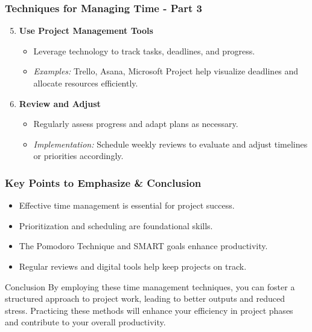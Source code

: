 \documentclass[aspectratio=169]{beamer}
\begin{document}
\begin{frame}[fragile]
    \frametitle{Techniques for Managing Time - Part 3}
    \begin{enumerate}
        \setcounter{enumi}{4} %
        \item \textbf{Use Project Management Tools}
            \begin{itemize}
                \item Leverage technology to track tasks, deadlines, and progress.
                \item \textit{Examples:} Trello, Asana, Microsoft Project help visualize deadlines and allocate resources efficiently.
            \end{itemize}
        
        \item \textbf{Review and Adjust}
            \begin{itemize}
                \item Regularly assess progress and adapt plans as necessary.
                \item \textit{Implementation:} Schedule weekly reviews to evaluate and adjust timelines or priorities accordingly.
            \end{itemize}
    \end{enumerate}
\end{frame}

\begin{frame}[fragile]
    \frametitle{Key Points to Emphasize & Conclusion}
    \begin{itemize}
        \item Effective time management is essential for project success.
        \item Prioritization and scheduling are foundational skills.
        \item The Pomodoro Technique and SMART goals enhance productivity.
        \item Regular reviews and digital tools help keep projects on track.
    \end{itemize}
    
    \begin{block}{Conclusion}
        By employing these time management techniques, you can foster a structured approach to project work, leading to better outputs and reduced stress. Practicing these methods will enhance your efficiency in project phases and contribute to your overall productivity.
    \end{block}
\end{frame}
\end{document}
